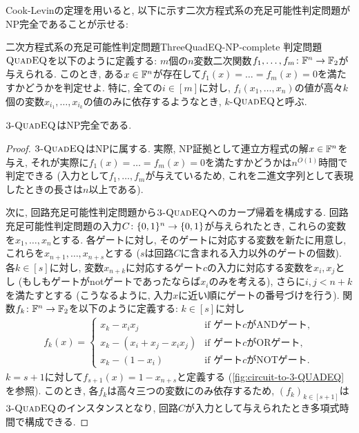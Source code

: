 Cook-Levinの定理を用いると, 以下に示す二次方程式系の充足可能性判定問題がNP完全であることが示せる:
\begin{theorem}{二次方程式系の充足可能性判定問題}{ThreeQuadEQ-NP-complete}
  判定問題$\textsc{QuadEQ}$を以下のように定義する:
  $m$個の$n$変数二次関数$f_1,\dots,f_m\colon \mathbb{F}^n\to\mathbb{F}_2$が与えられる.
  このとき, ある$x\in\mathbb{F}^n$が存在して$f_1(x)=\dots=f_m(x)=0$を満たすかどうかを判定せよ.
  特に, 全ての$i\in[m]$に対し, $f_i(x_1,\dots,x_n)$の値が高々$k$個の変数$x_{i_1},\dots,x_{i_k}$の値のみに依存するようなとき, $k$-$\textsc{QuadEQ}$と呼ぶ.
  
  $\textsc{3-QuadEQ}$はNP完全である.
\end{theorem}
\begin{proof}
  $\textsc{3-QuadEQ}$はNPに属する.
  実際, NP証拠として連立方程式の解$x\in\mathbb{F}^n$を与え, それが実際に$f_1(x)=\dots=f_m(x)=0$を満たすかどうかは$n^{O(1)}$時間で判定できる (入力として$f_1,\dots,f_m$が与えているため, これを二進文字列として表現したときの長さは$n$以上である).

  次に, 回路充足可能性判定問題から$\textsc{3-QuadEQ}$へのカープ帰着を構成する.
  回路充足可能性判定問題の入力$C\colon\{0,1\}^n\to\{0,1\}$が与えられたとき, これらの変数を$x_1,\dots,x_n$とする.
  各ゲートに対し, そのゲートに対応する変数を新たに用意し, これらを$x_{n+1},\dots,x_{n+s}$とする ($s$は回路$C$に含まれる入力以外のゲートの個数).
  各$k\in[s]$に対し, 変数$x_{n+k}$に対応するゲート$c$の入力に対応する変数を$x_i,x_j$とし (もしもゲートがnotゲートであったならば$x_i$のみを考える), さらに$i,j < n+k$を満たすとする (こうなるように, 入力$x$に近い順にゲートの番号づけを行う).
  関数$f_k\colon \mathbb{F}^n\to\mathbb{F}_2$を以下のように定義する: $k\in[s]$に対し
  \begin{align*}
    f_k(x) = \begin{cases}
      x_k - x_i x_j & \text{if ゲート$c$がANDゲート}, \\
      x_k - (x_i + x_j - x_i x_j) & \text{if ゲート$c$がORゲート}, \\
      x_k - (1-x_i) & \text{if ゲート$c$がNOTゲート}.
    \end{cases}
  \end{align*}
  $k=s+1$に対して$f_{s+1}(x) = 1 - x_{n+s}$と定義する (\cref{fig:circuit-to-3-QUADEQ}を参照).
  このとき, 各$f_k$は高々三つの変数にのみ依存するため,
  $(f_k)_{k\in[s+1]}$は$\textsc{3-QuadEQ}$のインスタンスとなり, 回路$C$が入力として与えられたとき多項式時間で構成できる.


\end{proof}

